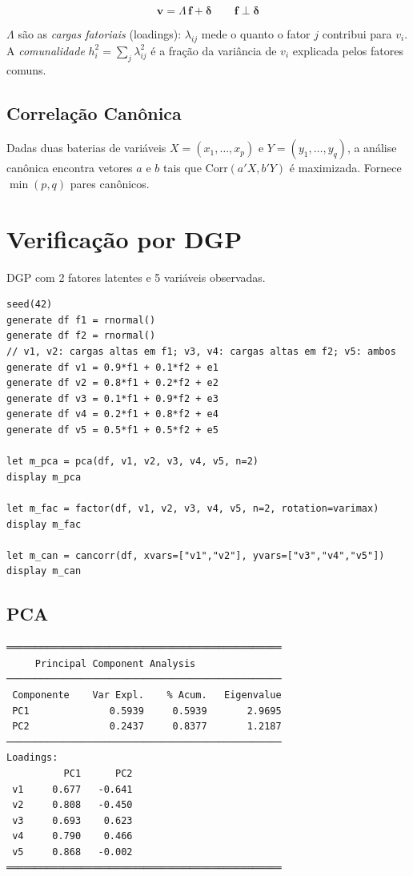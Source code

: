 \[
  \mathbf{v} = \Lambda\,\mathbf{f} + \boldsymbol{\delta}
  \qquad \mathbf{f} \perp \boldsymbol{\delta}
\]

$\Lambda$ são as \emph{cargas fatoriais} (loadings): $\lambda_{ij}$ mede o
quanto o fator $j$ contribui para $v_i$. A \emph{comunalidade} $h_i^2 = \sum_j \lambda_{ij}^2$
é a fração da variância de $v_i$ explicada pelos fatores comuns.

\subsection*{Correlação Canônica}

Dadas duas baterias de variáveis $X = (x_1,\ldots,x_p)$ e $Y = (y_1,\ldots,y_q)$,
a análise canônica encontra vetores $a$ e $b$ tais que $\mathrm{Corr}(a'X, b'Y)$
é maximizada. Fornece $\min(p,q)$ pares canônicos.

\section{Verificação por DGP}

DGP com 2 fatores latentes e 5 variáveis observadas.

\begin{lstlisting}[caption={DGP fatorial e análise multivariada}]
seed(42)
generate df f1 = rnormal()
generate df f2 = rnormal()
// v1, v2: cargas altas em f1; v3, v4: cargas altas em f2; v5: ambos
generate df v1 = 0.9*f1 + 0.1*f2 + e1
generate df v2 = 0.8*f1 + 0.2*f2 + e2
generate df v3 = 0.1*f1 + 0.9*f2 + e3
generate df v4 = 0.2*f1 + 0.8*f2 + e4
generate df v5 = 0.5*f1 + 0.5*f2 + e5

let m_pca = pca(df, v1, v2, v3, v4, v5, n=2)
display m_pca

let m_fac = factor(df, v1, v2, v3, v4, v5, n=2, rotation=varimax)
display m_fac

let m_can = cancorr(df, xvars=["v1","v2"], yvars=["v3","v4","v5"])
display m_can
\end{lstlisting}

\subsection*{PCA}

\begin{lstlisting}[language={}, basicstyle=\ttfamily\small,
  frame=none, numbers=none, backgroundcolor=\color{codbg},
  xleftmargin=0pt, xrightmargin=0pt, breaklines=false]
════════════════════════════════════════════════
     Principal Component Analysis
────────────────────────────────────────────────
 Componente    Var Expl.    % Acum.   Eigenvalue
 PC1              0.5939     0.5939       2.9695
 PC2              0.2437     0.8377       1.2187
────────────────────────────────────────────────
Loadings:
          PC1      PC2
 v1     0.677   -0.641
 v2     0.808   -0.450
 v3     0.693    0.623
 v4     0.790    0.466
 v5     0.868   -0.002
════════════════════════════════════════════════
\end{lstlisting}

